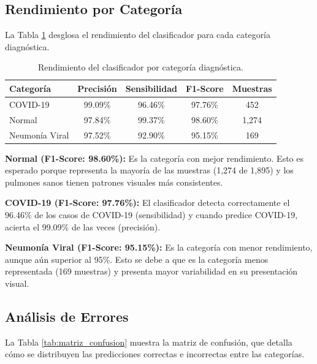 \subsection{Rendimiento por Categoría}
\label{subsec:rendimiento_por_clase}

La Tabla \ref{tab:metricas_por_clase} desglosa el rendimiento del clasificador para cada categoría diagnóstica.

\begin{table}[htbp]
    \centering
    \caption{Rendimiento del clasificador por categoría diagnóstica.}
    \label{tab:metricas_por_clase}
    \small
    \begin{tabular}{@{}lcccc@{}}
        \toprule
        \textbf{Categoría} & \textbf{Precisión} & \textbf{Sensibilidad} & \textbf{F1-Score} & \textbf{Muestras} \\
        \midrule
        COVID-19 & 99.09\% & 96.46\% & 97.76\% & 452 \\
        Normal & 97.84\% & 99.37\% & 98.60\% & 1,274 \\
        Neumonía Viral & 97.52\% & 92.90\% & 95.15\% & 169 \\
        \bottomrule
    \end{tabular}
\end{table}

\textbf{Normal (F1-Score: 98.60\%):} Es la categoría con mejor rendimiento. Esto es esperado porque representa la mayoría de las muestras (1,274 de 1,895) y los pulmones sanos tienen patrones visuales más consistentes.

\textbf{COVID-19 (F1-Score: 97.76\%):} El clasificador detecta correctamente el 96.46\% de los casos de COVID-19 (sensibilidad) y cuando predice COVID-19, acierta el 99.09\% de las veces (precisión).

\textbf{Neumonía Viral (F1-Score: 95.15\%):} Es la categoría con menor rendimiento, aunque aún superior al 95\%. Esto se debe a que es la categoría menos representada (169 muestras) y presenta mayor variabilidad en su presentación visual.

\subsection{Análisis de Errores}
\label{subsec:matriz_confusion}

La Tabla \ref{tab:matriz_confusion} muestra la matriz de confusión, que detalla cómo se distribuyen las predicciones correctas e incorrectas entre las categorías.

